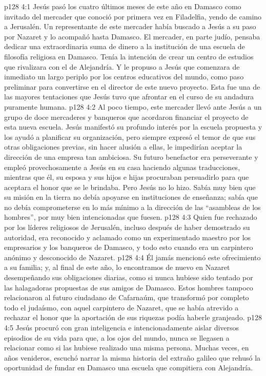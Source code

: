 \vs p128 4:1 Jesús pasó los cuatro últimos meses de este año en Damasco como invitado del mercader que conoció por primera vez en Filadelfia, yendo de camino a Jerusalén. Un representante de este mercader había buscado a Jesús a su paso por Nazaret y lo acompañó hasta Damasco. El mercader, en parte judío, pensaba dedicar una extraordinaria suma de dinero a la institución de una escuela de filosofía religiosa en Damasco. Tenía la intención de crear un centro de estudios que rivalizara con el de Alejandría. Y le propuso a Jesús que comenzara de inmediato un largo periplo por los centros educativos del mundo, como paso preliminar para convertirse en el director de este nuevo proyecto. Esta fue una de las mayores tentaciones que Jesús tuvo que afrontar en el curso de su andadura puramente humana.
\vs p128 4:2 Al poco tiempo, este mercader llevó ante Jesús a un grupo de doce mercaderes y banqueros que acordaron financiar el proyecto de esta nueva escuela. Jesús manifestó su profundo interés por la escuela propuesta y los ayudó a planificar su organización, pero siempre expresó el temor de que sus otras obligaciones previas, sin hacer alusión a ellas, le impedirían aceptar la dirección de una empresa tan ambiciosa. Su futuro benefactor era perseverante y empleó provechosamente a Jesús en su casa haciendo algunas traducciones, mientras que él, su esposa y sus hijos e hijas procuraban persuadirlo para que aceptara el honor que se le brindaba. Pero Jesús no lo hizo. Sabía muy bien que su misión en la tierra no debía apoyarse en instituciones de enseñanza; sabía que no debía comprometerse en lo más mínimo a la dirección de las “asambleas de los hombres”, por muy bien intencionadas que fuesen.
\vs p128 4:3 Quien fue rechazado por los líderes religiosos de Jerusalén, incluso después de haber demostrado su autoridad, era reconocido y aclamado como un experimentado maestro por los empresarios y los banqueros de Damasco, y todo esto cuando era un carpintero anónimo y desconocido de Nazaret.
\vs p128 4:4 Él jamás mencionó este ofrecimiento a su familia; y, al final de este año, lo encontramos de nuevo en Nazaret desempeñando sus obligaciones diarias, como si nunca hubiese sido tentado por las halagadoras propuestas de sus amigos de Damasco. Estos hombres tampoco relacionaron al futuro ciudadano de Cafarnaúm, que transformó por completo todo el judaísmo, con aquel carpintero de Nazaret, que se había atrevido a rechazar el honor que la aportación de sus riquezas podía haberle granjeado.
\vs p128 4:5 \pc Jesús procuró con gran inteligencia e intencionadamente aislar diversos episodios de su vida para que, a los ojos del mundo, nunca se llegasen a relacionar como si las hubiese realizado una misma persona. Muchas veces, en años venideros, escuchó narrar la misma historia del extraño galileo que rehusó la oportunidad de fundar en Damasco una escuela que compitiera con Alejandría.
